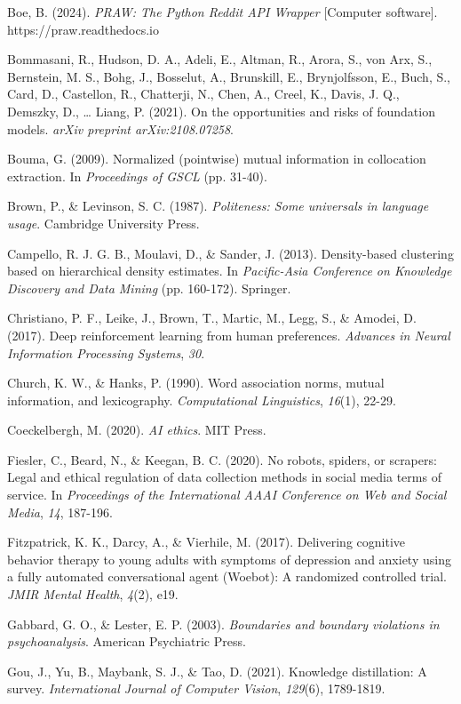 \documentclass[11pt]{article}
\begin{document}
Boe, B. (2024). \emph{PRAW: The Python Reddit API Wrapper} [Computer software]. https://praw.readthedocs.io

Bommasani, R., Hudson, D. A., Adeli, E., Altman, R., Arora, S., von Arx, S., Bernstein, M. S., Bohg, J., Bosselut, A., Brunskill, E., Brynjolfsson, E., Buch, S., Card, D., Castellon, R., Chatterji, N., Chen, A., Creel, K., Davis, J. Q., Demszky, D., \ldots{} Liang, P. (2021). On the opportunities and risks of foundation models. \emph{arXiv preprint arXiv:2108.07258}.

Bouma, G. (2009). Normalized (pointwise) mutual information in collocation extraction. In \emph{Proceedings of GSCL} (pp. 31-40).

Brown, P., \& Levinson, S. C. (1987). \emph{Politeness: Some universals in language usage}. Cambridge University Press.

Campello, R. J. G. B., Moulavi, D., \& Sander, J. (2013). Density-based clustering based on hierarchical density estimates. In \emph{Pacific-Asia Conference on Knowledge Discovery and Data Mining} (pp. 160-172). Springer.

Christiano, P. F., Leike, J., Brown, T., Martic, M., Legg, S., \& Amodei, D. (2017). Deep reinforcement learning from human preferences. \emph{Advances in Neural Information Processing Systems}, \emph{30}.

Church, K. W., \& Hanks, P. (1990). Word association norms, mutual information, and lexicography. \emph{Computational Linguistics}, \emph{16}(1), 22-29.

Coeckelbergh, M. (2020). \emph{AI ethics}. MIT Press.

Fiesler, C., Beard, N., \& Keegan, B. C. (2020). No robots, spiders, or scrapers: Legal and ethical regulation of data collection methods in social media terms of service. In \emph{Proceedings of the International AAAI Conference on Web and Social Media}, \emph{14}, 187-196.

Fitzpatrick, K. K., Darcy, A., \& Vierhile, M. (2017). Delivering cognitive behavior therapy to young adults with symptoms of depression and anxiety using a fully automated conversational agent (Woebot): A randomized controlled trial. \emph{JMIR Mental Health}, \emph{4}(2), e19.

Gabbard, G. O., \& Lester, E. P. (2003). \emph{Boundaries and boundary violations in psychoanalysis}. American Psychiatric Press.

Gou, J., Yu, B., Maybank, S. J., \& Tao, D. (2021). Knowledge distillation: A survey. \emph{International Journal of Computer Vision}, \emph{129}(6), 1789-1819.
\end{document}
